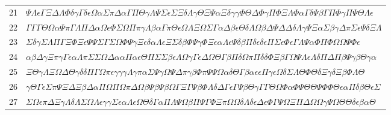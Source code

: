 \documentclass[11pt,a4paper]{article}
\begin{document}
\begin{boitecertificat}
{\begin{tabular}{@{}r l@{}}
21 & \textcolor{spectralargent}{$\Psi\Lambda\epsilon\Gamma\Xi\Delta\Lambda\Phi\delta\gamma\Gamma\delta\epsilon\Omega\alpha\Sigma\pi\Delta\alpha\Gamma\Pi\Theta\gamma\Lambda\Psi\Sigma\epsilon\Sigma\Xi\delta\Lambda\gamma\Theta\Xi\Psi\alpha\Xi\delta\gamma\gamma\Phi\Theta\Delta\Phi\gamma\Pi\Phi\Xi\Lambda\Phi\alpha\Gamma\delta\Psi\beta\Gamma\Pi\Phi\gamma\Pi\Psi\Theta\Lambda\epsilon$} \\
22 & \textcolor{spectralargent}{$\Gamma\Gamma\Gamma\Theta\Omega\alpha\Psi\pi\Gamma\Lambda\Pi\Delta\alpha\Omega\epsilon\Phi\Sigma\Omega\Pi\pi\gamma\Lambda\beta\alpha\Gamma\pi\Theta\epsilon\Omega\Lambda\Xi\Omega\Sigma\Gamma\alpha\Delta\beta\epsilon\Theta\delta\Lambda\Omega\beta\Delta\Psi\Delta\Delta\delta\Lambda\gamma\Psi\Xi\alpha\Sigma\beta\gamma\Delta\pi\Sigma\epsilon\Psi\delta\Xi\Lambda$} \\
23 & \textcolor{spectralargent}{$\Sigma\delta\gamma\Sigma\Lambda\Pi\Gamma\Xi\Phi\Xi\epsilon\Psi\Psi\Sigma\Gamma\Sigma\Omega\Phi\Psi\gamma\Xi\epsilon\delta\alpha\Lambda\epsilon\Xi\Sigma\delta\beta\Phi\Psi\gamma\Phi\Xi\epsilon\alpha\Lambda\epsilon\Psi\delta\beta\Pi\delta\epsilon\delta\epsilon\Pi\Sigma\epsilon\Phi\epsilon\Gamma\Lambda\Psi\alpha\Phi\Pi\Phi\Omega\Omega\Psi\Phi\epsilon$} \\
24 & \textcolor{spectralargent}{$\alpha\beta\Delta\gamma\Xi\pi\gamma\Gamma\epsilon\alpha\Lambda\pi\Sigma\Sigma\Omega\Delta\alpha\alpha\Pi\alpha\epsilon\Theta\Pi\Sigma\Sigma\beta\epsilon\Lambda\Omega\gamma\Gamma\epsilon\Delta\Omega\Theta\Gamma\beta\Pi\delta\Omega\pi\Pi\delta\delta\Phi\Xi\beta\Gamma\Omega\Psi\Lambda\epsilon\Lambda\delta\Pi\Delta\Pi\beta\Psi\gamma\beta\Theta\gamma\alpha$} \\
25 & \textcolor{spectralargent}{$\Xi\Theta\gamma\Lambda\Xi\Omega\Delta\Theta\gamma\delta\delta\Pi\Gamma\Omega\pi\epsilon\gamma\gamma\gamma\Lambda\gamma\pi\alpha\Sigma\Psi\gamma\Omega\Psi\Delta\pi\gamma\beta\Phi\pi\Psi\Psi\Omega\alpha\delta\Theta\Gamma\beta\alpha\epsilon\epsilon\Pi\gamma\epsilon\Omega\delta\Sigma\Lambda\Theta\Phi\Theta\delta\Xi\gamma\delta\Xi\beta\Phi\Lambda\Theta$} \\
26 & \textcolor{spectralargent}{$\gamma\Theta\Gamma\epsilon\Sigma\pi\Psi\Xi\Delta\Xi\beta\Delta\alpha\Pi\Omega\Pi\Omega\pi\Delta\Omega\beta\Psi\beta\Psi\beta\Omega\Gamma\Xi\Gamma\Psi\beta\Phi\Lambda\delta\Delta\Gamma\epsilon\Gamma\Psi\beta\Theta\gamma\Gamma\Gamma\Theta\Omega\Phi\alpha\Phi\Psi\Theta\Theta\Psi\Phi\Phi\Theta\epsilon\alpha\Pi\delta\beta\Theta\epsilon\Sigma$} \\
27 & \textcolor{spectralargent}{$\Sigma\Omega\epsilon\pi\Delta\Xi\gamma\Lambda\delta\Lambda\Sigma\Omega\Lambda\epsilon\gamma\gamma\Sigma\epsilon\alpha\Lambda\epsilon\Omega\Theta\delta\Gamma\alpha\Pi\Lambda\Psi\Omega\beta\Pi\Psi\Gamma\Phi\Xi\pi\Omega\Omega\delta\Lambda\delta\epsilon\Delta\epsilon\Phi\Gamma\Psi\Omega\Xi\Pi\Delta\Omega\Omega\gamma\Psi\Omega\Theta\Theta\delta\epsilon\beta\alpha\Theta$} \\

\end{tabular}}
\end{boitecertificat}
\end{document}
